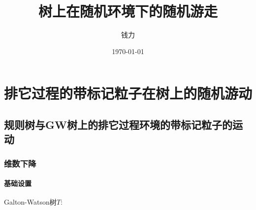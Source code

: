 \documentclass[a4paper,oneside]{ctexbook}
\begin{document}
\title{ \Huge \textbf{树上在随机环境下的随机游走} }
	
\vspace{4em}

\author{钱力}

\date{\today}

\maketitle
\thispagestyle{empty}





 



\cleardoublepage
{}
{}
\tableofcontents
\cleardoublepage

\newtheorem{thm}{定理}[chapter]
\newtheorem{que}[thm]{问题}
\newtheorem{pro}[thm]{命题}
\newtheorem{cor}[thm]{推论}
\newtheorem{defi}[thm]{定义}
\newtheorem{lem}[thm]{引理}
\newtheorem{conjec}[thm]{猜想}
\newtheorem{tri}[thm]{尝试}
\newtheorem{pf}[thm]{证明}
\newtheorem{iss}{Issue}

\chapter{排它过程的带标记粒子在树上的随机游动}

\section{规则树与GW树上的排它过程环境的带标记粒子的运动}

	


	
	\subsection{维数下降}

		\subsubsection*{基础设置}

			Galton-Watson树$T$:
\end{document}
